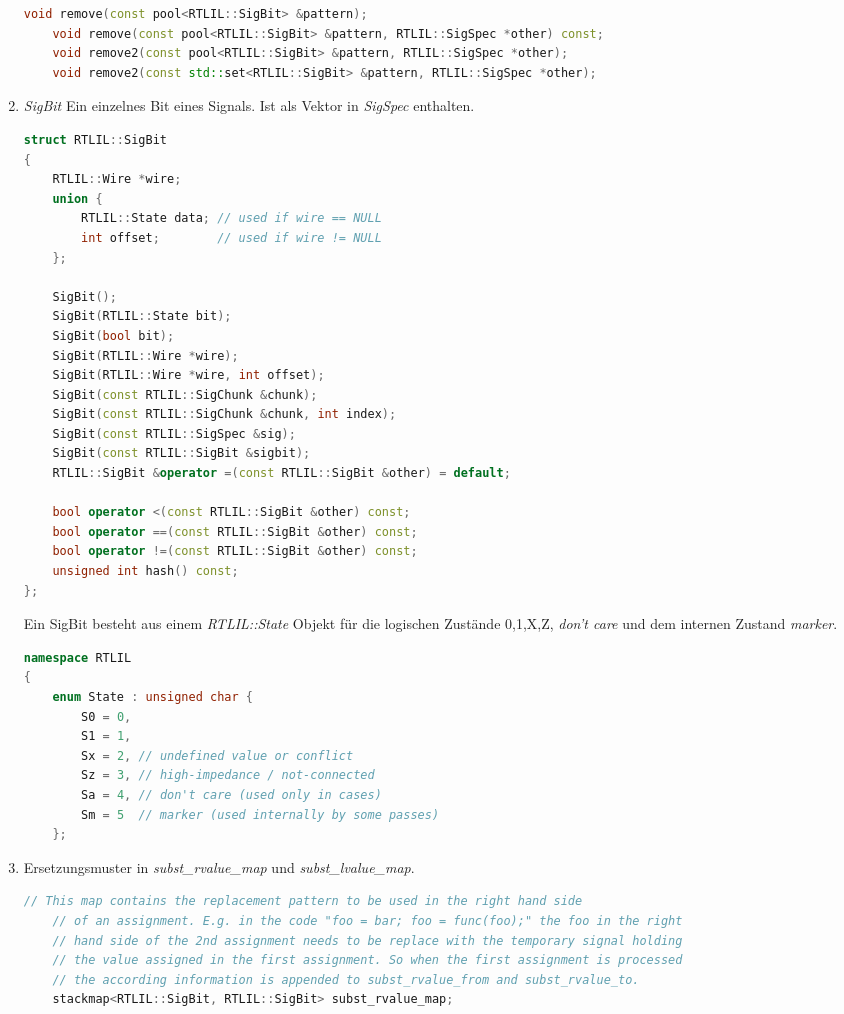 \documentclass[11pt]{report}
\begin{document}
\begin{enumerate}
\begin{lstlisting}[language=C++]
	void remove(const pool<RTLIL::SigBit> &pattern);
	void remove(const pool<RTLIL::SigBit> &pattern, RTLIL::SigSpec *other) const;
	void remove2(const pool<RTLIL::SigBit> &pattern, RTLIL::SigSpec *other);
	void remove2(const std::set<RTLIL::SigBit> &pattern, RTLIL::SigSpec *other);
\end{lstlisting}

\item{\textit{SigBit}}
Ein einzelnes Bit eines Signals. Ist als Vektor in \textit{SigSpec} enthalten.
\begin{lstlisting}[language=C++]
struct RTLIL::SigBit
{
	RTLIL::Wire *wire;
	union {
		RTLIL::State data; // used if wire == NULL
		int offset;        // used if wire != NULL
	};

	SigBit();
	SigBit(RTLIL::State bit);
	SigBit(bool bit);
	SigBit(RTLIL::Wire *wire);
	SigBit(RTLIL::Wire *wire, int offset);
	SigBit(const RTLIL::SigChunk &chunk);
	SigBit(const RTLIL::SigChunk &chunk, int index);
	SigBit(const RTLIL::SigSpec &sig);
	SigBit(const RTLIL::SigBit &sigbit);
	RTLIL::SigBit &operator =(const RTLIL::SigBit &other) = default;

	bool operator <(const RTLIL::SigBit &other) const;
	bool operator ==(const RTLIL::SigBit &other) const;
	bool operator !=(const RTLIL::SigBit &other) const;
	unsigned int hash() const;
};
\end{lstlisting}

Ein SigBit besteht aus einem \textit{RTLIL::State} Objekt für die logischen Zustände 0,1,X,Z, \textit{don't care} und dem internen Zustand \textit{marker}.
\begin{lstlisting}[language=C++]
namespace RTLIL
{
	enum State : unsigned char {
		S0 = 0,
		S1 = 1,
		Sx = 2, // undefined value or conflict
		Sz = 3, // high-impedance / not-connected
		Sa = 4, // don't care (used only in cases)
		Sm = 5  // marker (used internally by some passes)
	};
\end{lstlisting}



\item Ersetzungsmuster in \textit{subst\_rvalue\_map} und \textit{subst\_lvalue\_map}.
\begin{lstlisting}[language=C++]
	// This map contains the replacement pattern to be used in the right hand side
	// of an assignment. E.g. in the code "foo = bar; foo = func(foo);" the foo in the right
	// hand side of the 2nd assignment needs to be replace with the temporary signal holding
	// the value assigned in the first assignment. So when the first assignment is processed
	// the according information is appended to subst_rvalue_from and subst_rvalue_to.
	stackmap<RTLIL::SigBit, RTLIL::SigBit> subst_rvalue_map;


\end{lstlisting}
\end{enumerate}
\end{document}
